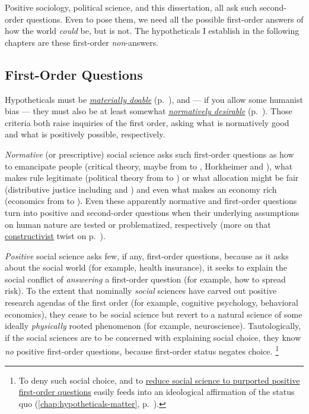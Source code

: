 Positive sociology, political science, and this dissertation, all ask such second-order questions.
Even to pose them, we need all the possible first-order answers of how the world \emph{could} be, but is not.
The hypotheticals I establish in the following chapters are these first-order \emph{non}-answers.

\subsection{First-Order Questions}
	\label{sec:1st-questions}
Hypotheticals must be \hyperref[sec:ontology]{\emph{materially doable}} (p.~\pageref{sec:ontology}), and --- if you allow some humanist bias --- they must also be at least somewhat \hyperref[sec:axiology]{\emph{normatively desirable}} (p.~\pageref{sec:axiology}).
Those criteria both raise inquiries of the first order, asking what is normatively good and what is positively possible, respectively.

\emph{Normative} (or prescriptive) social science asks such first-order questions as how to emancipate people (critical theory, maybe from \citeauthor{Gramsci1971}  to \citeauthor{Adorno-1974-aa}, Horkheimer and \citeauthor{Habermas-1984}), what makes rule legitimate (political theory from \citeauthor{Aristoteles} to \citeauthor{Dahl-1989-aa}) or what allocation might be fair (distributive justice including \citeauthor{Friedman1962} and \citeauthor{Rawls1986}) and even what makes an economy rich (economics from \citeauthor{Smith-1776-lq} to \citeauthor{Hicks1939}).
Even these apparently normative and first-order questions turn into positive and second-order questions when their underlying assumptions on human nature are tested or problematized, respectively (more on that \hyperref[itm:constructivism]{constructivist} twist on p.~\pageref{itm:constructivism}).

\emph{Positive} social science asks few, if any, first-order questions, because as it asks about the social world (for example, health insurance), it seeks to explain the social conflict of \emph{answering} a first-order question (for example, how to spread risk).
To the extent that nominally \emph{social} sciences have carved out positive research agendas of the first order (for example, cognitive psychology, behavioral economics), they cease to be social science but revert to a natural science of some ideally \emph{physically} rooted phenomenon (for example, neuroscience).
Tautologically, if the social sciences are to be concerned with explaining social choice, they know \emph{no} positive first-order questions, because first-order status negates choice.
\footnote{
	To deny such social choice, and to \hyperref[chap:hypotheticals-matter]{reduce social science to purported positive first-order questions} easily feeds into an ideological affirmation of the status quo (\autoref{chap:hypotheticals-matter}, p.~\pageref{chap:hypotheticals-matter}).%
}

